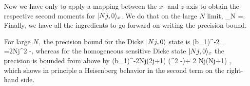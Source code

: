 Now we have only to apply a mapping between the $x$- and $z$-axis to obtain the respective second moments for $\vert Nj,0 \rangle_{x}$.
We do that on the large $N$ limit,
\be
  \lim_{N \to \infty} =.
\ee
Finally, we have all the ingredients to go forward on writing the precision bound.

For large $N,$ the precision bound for the Dicke $\vert Nj,0 \rangle$ state is
\be
\label{eq:exact precision bound for dicke ih state}
(\Delta b_1)^{-2}_{\max} =2Nj\lpar \sigma^2
-\eta\rpar,
\ee
whereas for the homogeneous sensitive Dicke state $\vert Nj,0 \rangle_x$ the precision is bounded from above by
\be
(\Delta b_1)^{-2}\leq Nj(2j+1) (\sigma^2 -\eta)+ 2 Nj(Nj+1) \eta,
\ee
which shows in principle a Heisenberg behavior in the second term on
the right-hand side.
%
%
%
%
%
%
%
%

